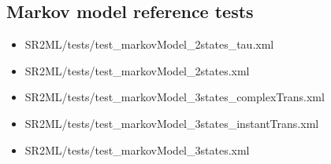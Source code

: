 \subsection{Markov model reference tests}
\begin{itemize}
	\item SR2ML/tests/test\_markovModel\_2states\_tau.xml
	\item SR2ML/tests/test\_markovModel\_2states.xml
	\item SR2ML/tests/test\_markovModel\_3states\_complexTrans.xml
	\item SR2ML/tests/test\_markovModel\_3states\_instantTrans.xml
	\item SR2ML/tests/test\_markovModel\_3states.xml
\end{itemize}
